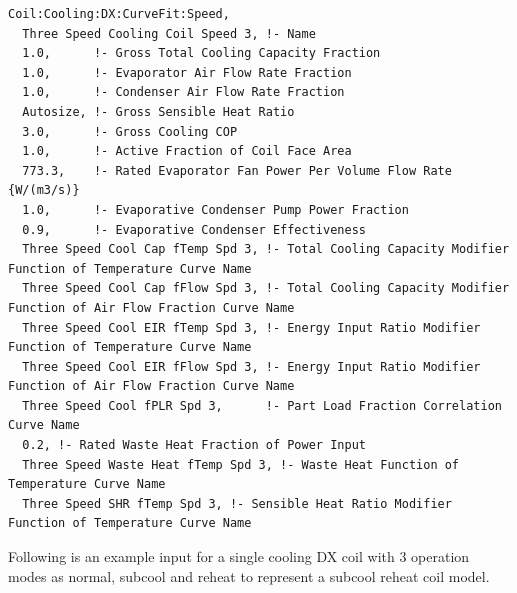 \begin{lstlisting}
Coil:Cooling:DX:CurveFit:Speed,
  Three Speed Cooling Coil Speed 3, !- Name
  1.0,      !- Gross Total Cooling Capacity Fraction
  1.0,      !- Evaporator Air Flow Rate Fraction
  1.0,      !- Condenser Air Flow Rate Fraction
  Autosize, !- Gross Sensible Heat Ratio
  3.0,      !- Gross Cooling COP
  1.0,      !- Active Fraction of Coil Face Area
  773.3,    !- Rated Evaporator Fan Power Per Volume Flow Rate {W/(m3/s)}
  1.0,      !- Evaporative Condenser Pump Power Fraction
  0.9,      !- Evaporative Condenser Effectiveness
  Three Speed Cool Cap fTemp Spd 3, !- Total Cooling Capacity Modifier Function of Temperature Curve Name
  Three Speed Cool Cap fFlow Spd 3, !- Total Cooling Capacity Modifier Function of Air Flow Fraction Curve Name
  Three Speed Cool EIR fTemp Spd 3, !- Energy Input Ratio Modifier Function of Temperature Curve Name
  Three Speed Cool EIR fFlow Spd 3, !- Energy Input Ratio Modifier Function of Air Flow Fraction Curve Name
  Three Speed Cool fPLR Spd 3,      !- Part Load Fraction Correlation Curve Name
  0.2, !- Rated Waste Heat Fraction of Power Input
  Three Speed Waste Heat fTemp Spd 3, !- Waste Heat Function of Temperature Curve Name
  Three Speed SHR fTemp Spd 3, !- Sensible Heat Ratio Modifier Function of Temperature Curve Name

\end{lstlisting}

Following is an example input for a single cooling DX coil with 3 operation modes as normal, subcool and reheat to represent a subcool reheat coil model.

